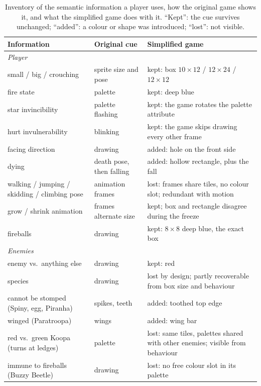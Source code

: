 \documentclass{article}
\begin{document}
\begin{table}[t]
  \caption{Inventory of the semantic information a player uses, how the original game shows it,
  and what the simplified game does with it. ``Kept'': the cue survives unchanged; ``added'': a
  colour or shape was introduced; ``lost'': not visible.}
  \centering
  \scriptsize
  \begin{tabular}{p{3.6cm}p{3.1cm}p{7.6cm}}
    \toprule
    Information & Original cue & Simplified game \\
    \midrule
    \multicolumn{3}{l}{\textit{Player}} \\
    small / big / crouching & sprite size and pose & kept: box $10\times12$ / $12\times24$ / $12\times12$ \\
    fire state & palette & kept: deep blue \\
    star invincibility & palette flashing & kept: the game rotates the palette attribute \\
    hurt invulnerability & blinking & kept: the game skips drawing every other frame \\
    facing direction & drawing & added: hole on the front side \\
    dying & death pose, then falling & added: hollow rectangle, plus the fall \\
    walking / jumping / skidding / climbing pose & animation frames & lost: frames share tiles, no colour slot; redundant with motion \\
    grow / shrink animation & frames alternate size & kept; box and rectangle disagree during the freeze \\
    fireballs & drawing & kept: $8\times8$ deep blue, the exact box \\
    \midrule
    \multicolumn{3}{l}{\textit{Enemies}} \\
    enemy vs.\ anything else & drawing & kept: red \\
    species & drawing & lost by design; partly recoverable from box size and behaviour \\
    cannot be stomped (Spiny, egg, Piranha) & spikes, teeth & added: toothed top edge \\
    winged (Paratroopa) & wings & added: wing bar \\
    red vs.\ green Koopa (turns at ledges) & palette & lost: same tiles, palettes shared with other enemies; visible from behaviour \\
    immune to fireballs (Buzzy Beetle) & drawing & lost: no free colour slot in its palette \\

\end{tabular}
\end{table}
\end{document}
